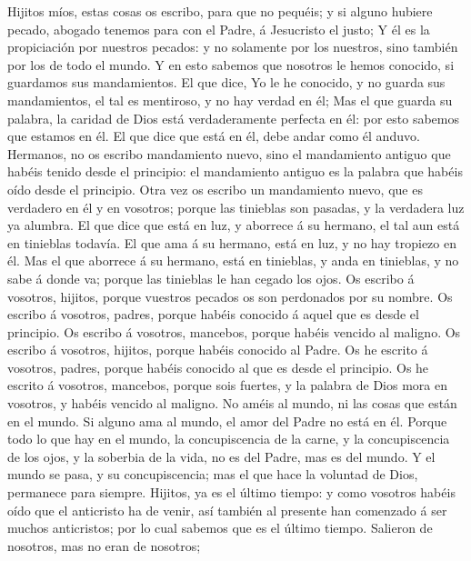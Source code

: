  Hijitos míos, estas cosas os escribo, para que no pequéis;
y si alguno hubiere pecado, abogado tenemos para con el Padre, á
Jesucristo el justo;  Y él es la propiciación por nuestros
pecados: y no solamente por los nuestros, sino también por los de todo
el mundo.  Y en esto sabemos que nosotros le hemos conocido,
si guardamos sus mandamientos.  El que dice, Yo le he
conocido, y no guarda sus mandamientos, el tal es mentiroso, y no hay
verdad en él;  Mas el que guarda su palabra, la caridad de
Dios está verdaderamente perfecta en él: por esto sabemos que estamos en
él.  El que dice que está en él, debe andar como él anduvo.
 Hermanos, no os escribo mandamiento nuevo, sino el
mandamiento antiguo que habéis tenido desde el principio: el mandamiento
antiguo es la palabra que habéis oído desde el principio. 
Otra vez os escribo un mandamiento nuevo, que es verdadero en él y en
vosotros; porque las tinieblas son pasadas, y la verdadera luz ya
alumbra.  El que dice que está en luz, y aborrece á su
hermano, el tal aun está en tinieblas todavía.  El que ama
á su hermano, está en luz, y no hay tropiezo en él.  Mas el
que aborrece á su hermano, está en tinieblas, y anda en tinieblas, y no
sabe á donde va; porque las tinieblas le han cegado los ojos.
 Os escribo á vosotros, hijitos, porque vuestros pecados os
son perdonados por su nombre.  Os escribo á vosotros,
padres, porque habéis conocido á aquel que es desde el principio. Os
escribo á vosotros, mancebos, porque habéis vencido al maligno. Os
escribo á vosotros, hijitos, porque habéis conocido al Padre.
 Os he escrito á vosotros, padres, porque habéis conocido
al que es desde el principio. Os he escrito á vosotros, mancebos, porque
sois fuertes, y la palabra de Dios mora en vosotros, y habéis vencido al
maligno.  No améis al mundo, ni las cosas que están en el
mundo. Si alguno ama al mundo, el amor del Padre no está en él.
 Porque todo lo que hay en el mundo, la concupiscencia de
la carne, y la concupiscencia de los ojos, y la soberbia de la vida, no
es del Padre, mas es del mundo.  Y el mundo se pasa, y su
concupiscencia; mas el que hace la voluntad de Dios, permanece para
siempre.  Hijitos, ya es el último tiempo: y como vosotros
habéis oído que el anticristo ha de venir, así también al presente han
comenzado á ser muchos anticristos; por lo cual sabemos que es el último
tiempo.  Salieron de nosotros, mas no eran de nosotros;
